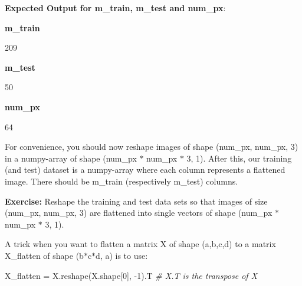 \documentclass[11pt]{article}
\newenvironment{Shaded}{}{}
\newcommand{\DecValTok}[1]{\textcolor[rgb]{0.25,0.63,0.44}{{#1}}}
\newcommand{\CommentTok}[1]{\textcolor[rgb]{0.38,0.63,0.69}{\textit{{#1}}}}
\newcommand{\NormalTok}[1]{{#1}}
\begin{document}
    \textbf{Expected Output for m\_train, m\_test and num\_px}:

\textbf{m\_train}

209

\textbf{m\_test}

50

\textbf{num\_px}

64

    For convenience, you should now reshape images of shape (num\_px,
num\_px, 3) in a numpy-array of shape (num\_px $*$ num\_px $*$ 3, 1).
After this, our training (and test) dataset is a numpy-array where each
column represents a flattened image. There should be m\_train
(respectively m\_test) columns.

\textbf{Exercise:} Reshape the training and test data sets so that
images of size (num\_px, num\_px, 3) are flattened into single vectors
of shape (num\_px $*$ num\_px $*$ 3, 1).

A trick when you want to flatten a matrix X of shape (a,b,c,d) to a
matrix X\_flatten of shape (b$*$c$*$d, a) is to use:

\begin{Shaded}
\begin{Highlighting}[]
\NormalTok{X_flatten = X.reshape(X.shape[}\DecValTok{0}\NormalTok{], -}\DecValTok{1}\NormalTok{).T      }\CommentTok{# X.T is the transpose of X}
\end{Highlighting}
\end{Shaded}
\end{document}
